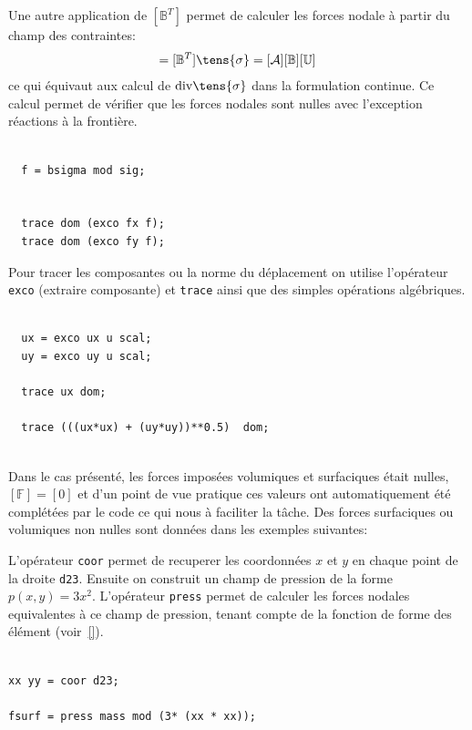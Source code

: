 \begin{castemcom}
Une autre application de $[\mathbb{B}^T]$ permet 
de calculer les forces nodale à partir du champ des contraintes:
\begin{eqnarray}
   [\mathbb{F}] = [\mathbb{B}^T] \tens{\sigma} = [{\cal A}] [\mathbb{B}] [\mathbb{U}]
\end{eqnarray}
ce qui équivaut aux calcul de ${\rm div} \tens{\sigma}$ dans la formulation continue. 
Ce calcul permet de vérifier que les forces nodales sont nulles avec l'exception réactions
à la frontière.   
\end{castemcom}
\begin{castemlines}
\begin{verbatim}

  f = bsigma mod sig;
 
   
  trace dom (exco fx f);
  trace dom (exco fy f);

\end{verbatim}
\end{castemlines}

\begin{castemcom}

Pour tracer les composantes ou la norme du déplacement 
on utilise l'opérateur \texttt{exco} (extraire composante) 
et \texttt{trace} ainsi que des simples opérations 
algébriques.  

\end{castemcom}
\begin{castemlines}
\begin{verbatim}

  ux = exco ux u scal;
  uy = exco uy u scal;

  trace ux dom;
  
  trace (((ux*ux) + (uy*uy))**0.5)  dom;
  

\end{verbatim}
\end{castemlines}

Dans le cas présenté, les forces imposées volumiques et surfaciques 
était nulles, $[\mathbb{F}] = [0]$ et d'un point de vue pratique ces valeurs ont 
automatiquement été complétées par le code ce qui nous à faciliter la tâche.
Des forces surfaciques ou volumiques non nulles sont données dans les 
exemples suivantes: 

\begin{castemcom}
L'opérateur \texttt{coor} permet de recuperer les coordonnées $x$ et $y$ 
en chaque point de la droite \texttt{d23}. Ensuite on construit un champ 
de pression de la forme $p(x,y) = 3 x^2$. L'opérateur \texttt{press} 
permet de calculer les forces nodales equivalentes à ce champ de pression,
tenant compte de la fonction de forme des élément (voir~\ref{}).
\end{castemcom}
\begin{castemlines}
\begin{verbatim}

xx yy = coor d23; 

fsurf = press mass mod (3* (xx * xx)); 

\end{verbatim}
\end{castemlines}

